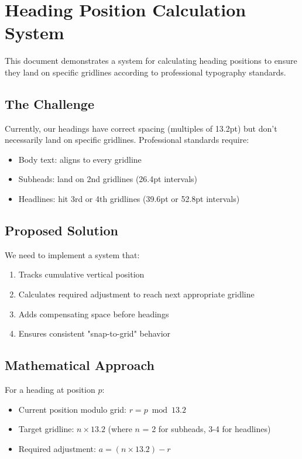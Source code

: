 \documentclass[11pt]{article}
\begin{document}
\section*{Heading Position Calculation System}

This document demonstrates a system for calculating heading positions to ensure they land on specific gridlines according to professional typography standards.

\subsection*{The Challenge}

Currently, our headings have correct spacing (multiples of 13.2pt) but don't necessarily land on specific gridlines. Professional standards require:
\begin{itemize}
\item Body text: aligns to every gridline
\item Subheads: land on 2nd gridlines (26.4pt intervals)
\item Headlines: hit 3rd or 4th gridlines (39.6pt or 52.8pt intervals)
\end{itemize}

\subsection*{Proposed Solution}

We need to implement a system that:
\begin{enumerate}
\item Tracks cumulative vertical position
\item Calculates required adjustment to reach next appropriate gridline
\item Adds compensating space before headings
\item Ensures consistent "snap-to-grid" behavior
\end{enumerate}

\subsection*{Mathematical Approach}

For a heading at position $p$:
\begin{itemize}
\item Current position modulo grid: $r = p \bmod 13.2$
\item Target gridline: $n \times 13.2$ (where $n$ = 2 for subheads, 3-4 for headlines)
\item Required adjustment: $a = (n \times 13.2) - r$
\end{itemize}
\end{document}

